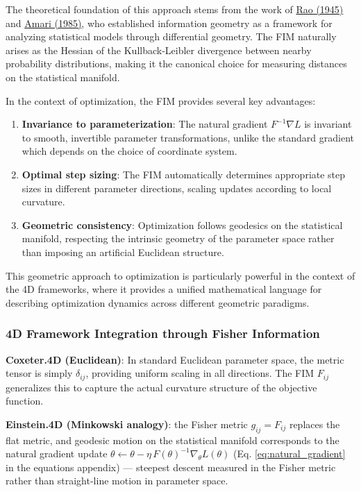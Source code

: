 \documentclass[
  10pt,
]{article}
\begin{document}
The theoretical foundation of this approach stems from the work of
\href{https://en.wikipedia.org/wiki/Cram\%C3\%A9r\%E2\%80\%93Rao_bound}{Rao
(1945)} and \href{https://en.wikipedia.org/wiki/Shun-ichi_Amari}{Amari
(1985)}, who established information geometry as a framework for
analyzing statistical models through differential geometry. The FIM
naturally arises as the Hessian of the Kullback-Leibler divergence
between nearby probability distributions, making it the canonical choice
for measuring distances on the statistical manifold.

In the context of optimization, the FIM provides several key advantages:

\begin{enumerate}
\def\labelenumi{\arabic{enumi}.}
\item
  \textbf{Invariance to parameterization}: The natural gradient
  \(F^{-1}\nabla L\) is invariant to smooth, invertible parameter
  transformations, unlike the standard gradient which depends on the
  choice of coordinate system.
\item
  \textbf{Optimal step sizing}: The FIM automatically determines
  appropriate step sizes in different parameter directions, scaling
  updates according to local curvature.
\item
  \textbf{Geometric consistency}: Optimization follows geodesics on the
  statistical manifold, respecting the intrinsic geometry of the
  parameter space rather than imposing an artificial Euclidean
  structure.
\end{enumerate}

This geometric approach to optimization is particularly powerful in the
context of the 4D frameworks, where it provides a unified mathematical
language for describing optimization dynamics across different geometric
paradigms.

\subsubsection{4D Framework Integration through Fisher
Information}\label{d-framework-integration-through-fisher-information}

\textbf{Coxeter.4D (Euclidean)}: In standard Euclidean parameter space,
the metric tensor is simply \(\delta_{ij}\), providing uniform scaling
in all directions. The FIM \(F_{ij}\) generalizes this to capture the
actual curvature structure of the objective function.

\textbf{Einstein.4D (Minkowski analogy)}: the Fisher metric
\(g_{ij} = F_{ij}\) replaces the flat metric, and geodesic motion on the
statistical manifold corresponds to the natural gradient update
\(\theta \leftarrow \theta - \eta\, F(\theta)^{-1} \nabla_\theta L(\theta)\)
(Eq. \eqref{eq:natural_gradient} in the equations appendix) --- steepest
descent measured in the Fisher metric rather than straight-line motion
in parameter space.
\end{document}
